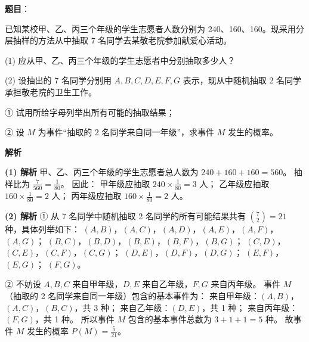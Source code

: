 \begin{answer}

\textbf{题目}：

已知某校甲、乙、丙三个年级的学生志愿者人数分别为 240、160、160。现采用分层抽样的方法从中抽取 7 名同学去某敬老院参加献爱心活动。

(1) 应从甲、乙、丙三个年级的学生志愿者中分别抽取多少人？

(2) 设抽出的 7 名同学分别用 $A,B,C,D,E,F,G$ 表示，现从中随机抽取 2 名同学承担敬老院的卫生工作。

① 试用所给字母列举出所有可能的抽取结果；

② 设 $M$ 为事件“抽取的 2 名同学来自同一年级”，求事件 $M$ 发生的概率。

\textbf{解析}

\textbf{(1) 解析} 甲、乙、丙三个年级的学生志愿者总人数为 $240+160+160=560$。
抽样比为 $\frac{7}{560}=\frac{1}{80}$。
因此：
甲年级应抽取 $240\times\frac{1}{80}=3$ 人；
乙年级应抽取 $160\times\frac{1}{80}=2$ 人；
丙年级应抽取 $160\times\frac{1}{80}=2$ 人。

\textbf{(2) 解析} ① 从 7 名同学中随机抽取 2 名同学的所有可能结果共有 $\binom72=21$ 种，具体列举如下：
$(A,B)$，$(A,C)$，$(A,D)$，$(A,E)$，$(A,F)$，$(A,G)$；
$(B,C)$，$(B,D)$，$(B,E)$，$(B,F)$，$(B,G)$；
$(C,D)$，$(C,E)$，$(C,F)$，$(C,G)$；
$(D,E)$，$(D,F)$，$(D,G)$；
$(E,F)$，$(E,G)$；
$(F,G)$。

② 不妨设 $A,B,C$ 来自甲年级，$D,E$ 来自乙年级，$F,G$ 来自丙年级。
事件 $M$（抽取的 2 名同学来自同一年级）包含的基本事件为：
来自甲年级：$(A,B)$，$(A,C)$，$(B,C)$，共 3 种；
来自乙年级：$(D,E)$，共 1 种；
来自丙年级：$(F,G)$，共 1 种。
所以事件 $M$ 包含的基本事件总数为 $3+1+1=5$ 种。
故事件 $M$ 发生的概率 $P(M)=\frac{5}{21}$。



\end{answer}
